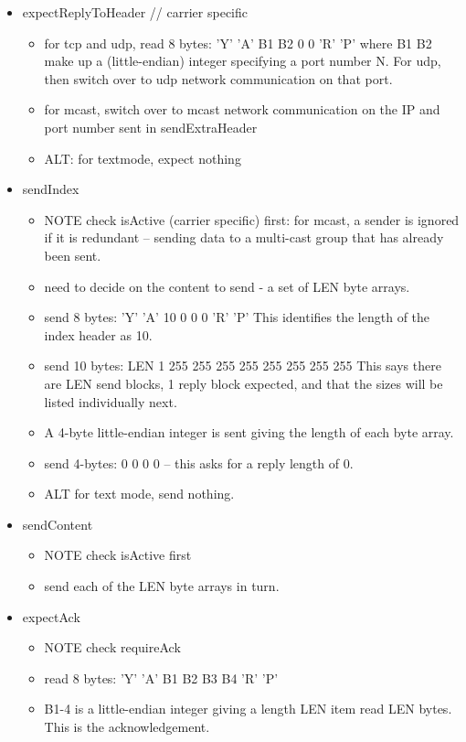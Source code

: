\documentclass[a4]{article}
\begin{document}
\begin{itemize}
  \item expectReplyToHeader    // carrier specific
    \begin{itemize}
      \item for tcp and udp, read 8 bytes:  'Y' 'A' B1 B2 0 0 'R' 'P' where
	B1 B2 make up a (little-endian) integer specifying a port number N.
	For udp, then switch over to udp network communication on that port.
      \item for mcast, switch over to mcast network communication on the IP and
	port number sent in sendExtraHeader
      \item ALT: for textmode, expect nothing
    \end{itemize}

  \item sendIndex

    \begin{itemize}
    \item NOTE check isActive (carrier specific) first: for mcast, a sender is ignored if it is redundant -- sending
    data to a multi-cast group that has already been sent.

    \item need to decide on the content to send - a set of LEN byte arrays.
    \item send 8 bytes: 'Y' 'A' 10 0 0 0 'R' 'P'
      This identifies the length of the index header as 10.
    \item send 10 bytes: LEN 1   255 255 255 255  255 255 255 255
      This says there are LEN send blocks, 1 reply block expected,
      and that the sizes will be listed individually next.
    \item A 4-byte little-endian integer is sent giving the length of
      each byte array.
    \item send 4-bytes: 0 0 0 0 -- this asks for a reply length of 0.
    \item ALT for text mode, send nothing.
    \end{itemize}

  \item sendContent

    \begin{itemize}
      \item NOTE check isActive first
      \item send each of the LEN byte arrays in turn.
    \end{itemize}

  \item expectAck
    \begin{itemize}
    \item NOTE check requireAck
    \item read 8 bytes: 'Y' 'A' B1 B2 B3 B4 'R' 'P'
    \item B1-4 is a little-endian integer giving a length LEN
    item read LEN bytes.  This is the acknowledgement.
    \end{itemize}
\end{itemize}
\end{document}
